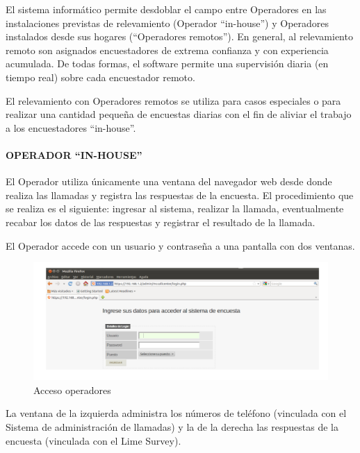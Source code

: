 \documentclass[
  openany]{book}
\begin{document}
El sistema informático permite desdoblar el campo entre Operadores en las instalaciones previstas de relevamiento (Operador ``in-house'') y Operadores instalados desde sus hogares (``Operadores remotos''). En general, al relevamiento remoto son asignados encuestadores de extrema confianza y con experiencia acumulada. De todas formas, el software permite una supervisión diaria (en tiempo real) sobre cada encuestador remoto.

El relevamiento con Operadores remotos se utiliza para casos especiales o para realizar una cantidad pequeña de encuestas diarias con el fin de aliviar el trabajo a los encuestadores ``in-house''.

\hypertarget{operador-in-house}{%
\paragraph{\texorpdfstring{\textbf{OPERADOR ``IN-HOUSE''}}{OPERADOR ``IN-HOUSE''}}\label{operador-in-house}}

El Operador utiliza únicamente una ventana del navegador web desde donde realiza las llamadas y registra las respuestas de la encuesta. El procedimiento que se realiza es el siguiente: ingresar al sistema, realizar la llamada, eventualmente recabar los datos de las respuestas y registrar el resultado de la llamada.

El Operador accede con un usuario y contraseña a una pantalla con dos ventanas.

\begin{figure}

{\centering \includegraphics[width=1\linewidth]{imagenes/figura6-14} 

}

\caption{Acceso operadores}\label{fig:Acce}
\end{figure}

La ventana de la izquierda administra los números de teléfono (vinculada con el Sistema de administración de llamadas) y la de la derecha las respuestas de la encuesta (vinculada con el Lime Survey).
\end{document}
